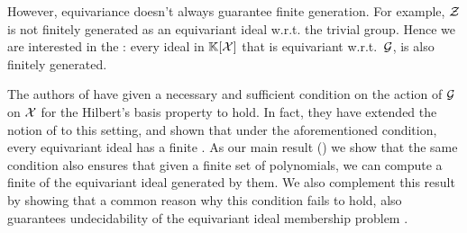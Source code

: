 However, equivariance doesn't always guarantee finite generation.
For example, $\mathcal{Z}$ is not finitely generated as an equivariant ideal w.r.t. the trivial group.
Hence we are interested in the :
every ideal in $\mathbb{K}[\mathcal{X}]$ that is equivariant w.r.t.\ $\mathcal{G}$,
is also finitely generated.

The authors of \cite{GHOLAS24} have given a necessary and sufficient condition  
on the action of $\mathcal{G}$ on $\mathcal{X}$ for the Hilbert's basis property to hold.
In fact, they have extended the notion of  to this setting,
and shown that under the aforementioned condition,
every equivariant ideal has a finite .
As our main result () we show that the same condition also ensures that given a finite set of polynomials,
we can compute a finite  of the equivariant ideal generated by them.
We also complement this result by showing that a common reason why this condition fails to hold,
also guarantees undecidability of the equivariant ideal membership problem
.


